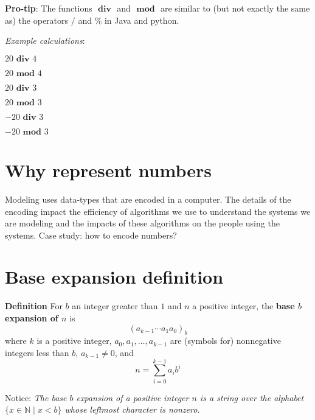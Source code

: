 \documentclass[12pt, oneside]{article}
\newcommand{\st}{\mid}
\begin{document}
{\bf Pro-tip}: The functions $\textbf{ div }$ and $\textbf{ mod }$ are similar to (but not exactly the same as) 
the operators $/$ and $\%$ in Java and python.

\vfill

{\it Example calculations}:

$20 \textbf{ div } 4$

\vspace{20pt}

$20 \textbf{ mod } 4$

\vspace{20pt}

$20 \textbf{ div } 3$

\vspace{20pt}

$20 \textbf{ mod } 3$

\vspace{20pt}

$-20 \textbf{ div } 3$

\vspace{20pt}

$-20 \textbf{ mod } 3$

\vfill \vfill
\section*{Why represent numbers}


Modeling uses data-types that are encoded in a computer.
The details of the encoding impact the efficiency of algorithms
we use to understand the systems we are modeling and the 
impacts of these algorithms on the people using the systems.
Case study: how to encode numbers?

\vfill \vfill
\section*{Base expansion definition}


{\bf Definition} For $b$ an integer greater than $1$ and $n$ a positive integer, 
the {\bf base $b$ expansion of $n$}  is
\[
(a_{k-1} \cdots a_1 a_0)_b
\]
where $k$ is a positive integer, $a_0, a_1, \ldots, a_{k-1}$ 
are (symbols for) nonnegative integers less than $b$, $a_{k-1} \neq  0$, and
\[
n =  \sum_{i=0}^{k-1} a_{i} b^{i}
\]

Notice: {\it The base $b$ expansion of a positive integer $n$ is a string over the alphabet 
$\{x \in \mathbb{N} \st x < b\}$
whose leftmost character is nonzero.}
\end{document}
